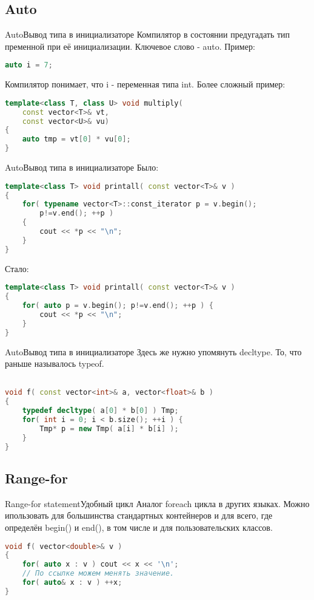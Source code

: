 \documentclass[10pt]{beamer}
\begin{document}
\subsection{Auto}
\hypertarget{Auto}{}
\begin{frame}[fragile]{Auto}{Вывод типа в инициализаторе}
Компилятор в состоянии предугадать тип пременной при её инициализации. Ключевое слово - auto. Пример:
\begin{lstlisting}[language=C++]
auto i = 7;
\end{lstlisting}
Компилятор понимает, что i - переменная типа int. Более сложный пример:
\begin{lstlisting}[language=C++]
template<class T, class U> void multiply(
    const vector<T>& vt, 
    const vector<U>& vu)
{
    auto tmp = vt[0] * vu[0];
}
\end{lstlisting}
\end{frame}


\begin{frame}[fragile]{Auto}{Вывод типа в инициализаторе}
Было:
\begin{lstlisting}[language=C++]
template<class T> void printall( const vector<T>& v )
{
    for( typename vector<T>::const_iterator p = v.begin(); 
        p!=v.end(); ++p ) 
    {
        cout << *p << "\n";
    }
}
\end{lstlisting}
\vspace{5mm}
Стало:
\begin{lstlisting}[language=C++]
template<class T> void printall( const vector<T>& v )
{
    for( auto p = v.begin(); p!=v.end(); ++p ) {
        cout << *p << "\n";
    }
}
\end{lstlisting}
\end{frame}

\begin{frame}[fragile]{Auto}{Вывод типа в инициализаторе}
Здесь же нужно упомянуть decltype. То, что раньше называлось typeof.
\begin{lstlisting}[language=C++]

void f( const vector<int>& a, vector<float>& b )
{
    typedef decltype( a[0] * b[0] ) Tmp;
    for( int i = 0; i < b.size(); ++i ) {
        Tmp* p = new Tmp( a[i] * b[i] );
    }
}
\end{lstlisting}
\end{frame}

\subsection{Range-for}
\hypertarget{Range-for}{}
\begin{frame}[fragile]{Range-for statement}{Удобный цикл}
 Аналог foreach цикла в других языках. Можно ипользовать для большинства стандартных контейнеров и для всего, где определён begin() и end(), в том числе и для пользовательских классов.
\begin{lstlisting}[language=C++]
void f( vector<double>& v )
{
    for( auto x : v ) cout << x << '\n';
    // По ссылке можем менять значение.
    for( auto& x : v ) ++x;	
}
\end{lstlisting}
\end{frame}
\end{document}
